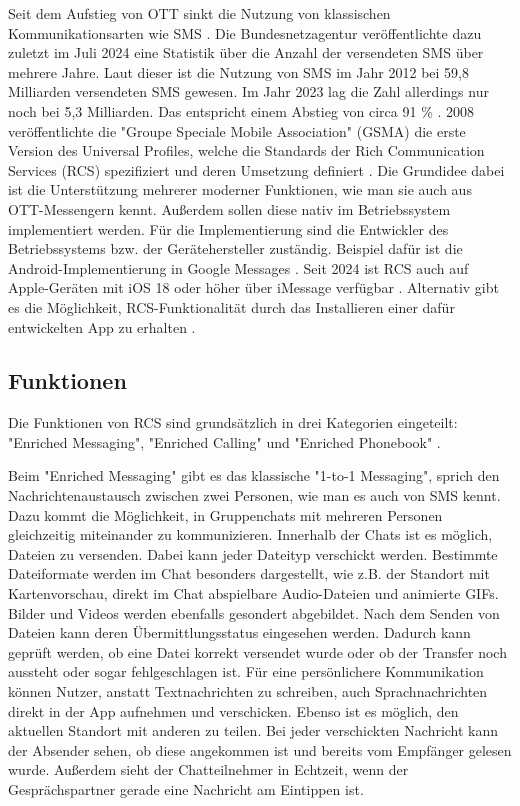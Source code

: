 \documentclass[conference]{IEEEtran}
\begin{document}
Seit dem Aufstieg von OTT sinkt die Nutzung von klassischen Kommunikationsarten wie SMS \cite{ottmobinter}.
Die Bundesnetzagentur veröffentlichte dazu zuletzt im Juli 2024 eine Statistik über die Anzahl der versendeten SMS über mehrere Jahre.
Laut dieser ist die Nutzung von SMS im Jahr 2012 bei 59,8 Milliarden versendeten SMS gewesen.
Im Jahr 2023 lag die Zahl allerdings nur noch bei 5,3 Milliarden.
Das entspricht einem Abstieg von circa 91 \% \cite{smsstats}.
2008 veröffentlichte die "Groupe Speciale Mobile Association" (GSMA) die erste Version des Universal Profiles, welche die Standards der Rich Communication Services (RCS) spezifiziert und deren Umsetzung definiert \cite{rcsuite}.
Die Grundidee dabei ist die Unterstützung mehrerer moderner Funktionen, wie man sie auch aus OTT-Messengern kennt.
Außerdem sollen diese nativ im Betriebssystem implementiert werden.
Für die Implementierung sind die Entwickler des Betriebssystems bzw. der Gerätehersteller zuständig.
Beispiel dafür ist die Android-Implementierung in Google Messages \cite{googlemessages}.
Seit 2024 ist RCS auch auf Apple-Geräten mit iOS 18 oder höher über iMessage verfügbar \cite{applemessages}.
Alternativ gibt es die Möglichkeit, RCS-Funktionalität durch das Installieren einer dafür entwickelten App zu erhalten \cite{uniprof}.

\subsection{Funktionen}

Die Funktionen von RCS sind grundsätzlich in drei Kategorien eingeteilt: "Enriched Messaging", "Enriched Calling" und "Enriched Phonebook" \cite{rcsuite,uniprof}.

Beim "Enriched Messaging" gibt es das klassische "1-to-1 Messaging", sprich den Nachrichtenaustausch zwischen zwei Personen, wie man es auch von SMS kennt.
Dazu kommt die Möglichkeit, in Gruppenchats mit mehreren Personen gleichzeitig miteinander zu kommunizieren.
Innerhalb der Chats ist es möglich, Dateien zu versenden.
Dabei kann jeder Dateityp verschickt werden. Bestimmte Dateiformate werden im Chat besonders dargestellt, wie z.B. der Standort mit Kartenvorschau, direkt im Chat abspielbare Audio-Dateien und animierte GIFs.
Bilder und Videos werden ebenfalls gesondert abgebildet.
Nach dem Senden von Dateien kann deren Übermittlungsstatus eingesehen werden.
Dadurch kann geprüft werden, ob eine Datei korrekt versendet wurde oder ob der Transfer noch aussteht oder sogar fehlgeschlagen ist.
Für eine persönlichere Kommunikation können Nutzer, anstatt Textnachrichten zu schreiben, auch Sprachnachrichten direkt in der App aufnehmen und verschicken.
Ebenso ist es möglich, den aktuellen Standort mit anderen zu teilen.
Bei jeder verschickten Nachricht kann der Absender sehen, ob diese angekommen ist und bereits vom Empfänger gelesen wurde.
Außerdem sieht der Chatteilnehmer in Echtzeit, wenn der Gesprächspartner gerade eine Nachricht am Eintippen ist.
\end{document}
